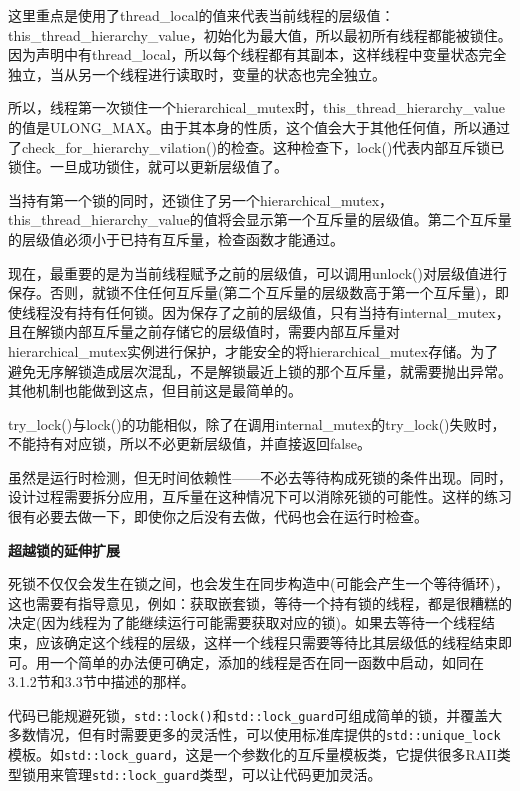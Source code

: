这里重点是使用了thread\_local的值来代表当前线程的层级值：this\_thread\_hierarchy\_value，初始化为最大值，所以最初所有线程都能被锁住。因为声明中有thread\_local，所以每个线程都有其副本，这样线程中变量状态完全独立，当从另一个线程进行读取时，变量的状态也完全独立。

所以，线程第一次锁住一个hierarchical\_mutex时，this\_thread\_hierarchy\_value的值是ULONG\_MAX。由于其本身的性质，这个值会大于其他任何值，所以通过了check\_for\_hierarchy\_vilation()的检查。这种检查下，lock()代表内部互斥锁已锁住。一旦成功锁住，就可以更新层级值了。

当持有第一个锁的同时，还锁住了另一个hierarchical\_mutex，this\_thread\_hierarchy\_value的值将会显示第一个互斥量的层级值。第二个互斥量的层级值必须小于已持有互斥量，检查函数才能通过。

现在，最重要的是为当前线程赋予之前的层级值，可以调用unlock()对层级值进行保存。否则，就锁不住任何互斥量(第二个互斥量的层级数高于第一个互斥量)，即使线程没有持有任何锁。因为保存了之前的层级值，只有当持有internal\_mutex，且在解锁内部互斥量之前存储它的层级值时，需要内部互斥量对hierarchical\_mutex实例进行保护，才能安全的将hierarchical\_mutex存储。为了避免无序解锁造成层次混乱，不是解锁最近上锁的那个互斥量，就需要抛出异常。其他机制也能做到这点，但目前这是最简单的。

try\_lock()与lock()的功能相似，除了在调用internal\_mutex的try\_lock()失败时，不能持有对应锁，所以不必更新层级值，并直接返回false。

虽然是运行时检测，但无时间依赖性——不必去等待构成死锁的条件出现。同时，设计过程需要拆分应用，互斥量在这种情况下可以消除死锁的可能性。这样的练习很有必要去做一下，即使你之后没有去做，代码也会在运行时检查。

\textbf{超越锁的延伸扩展}

死锁不仅仅会发生在锁之间，也会发生在同步构造中(可能会产生一个等待循环)，这也需要有指导意见，例如：获取嵌套锁，等待一个持有锁的线程，都是很糟糕的决定(因为线程为了能继续运行可能需要获取对应的锁)。如果去等待一个线程结束，应该确定这个线程的层级，这样一个线程只需要等待比其层级低的线程结束即可。用一个简单的办法便可确定，添加的线程是否在同一函数中启动，如同在3.1.2节和3.3节中描述的那样。

代码已能规避死锁，\texttt{std::lock()}和\texttt{std::lock\_guard}可组成简单的锁，并覆盖大多数情况，但有时需要更多的灵活性，可以使用标准库提供的\texttt{std::unique\_lock}模板。如\texttt{std::lock\_guard}，这是一个参数化的互斥量模板类，它提供很多RAII类型锁用来管理\texttt{std::lock\_guard}类型，可以让代码更加灵活。


